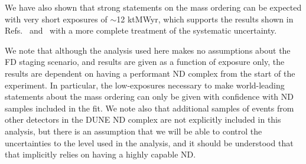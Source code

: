 We have also shown that strong statements on the mass ordering can be expected with very short exposures of $\sim$12 ktMWyr, which supports the results shown in Refs.~\cite{Abi:2020qib} and~\cite{Abi:2020evt} with a more complete treatment of the systematic uncertainty.

We note that although the analysis used here makes no assumptions about the FD staging scenario, and results are given as a function of exposure only, the results are dependent on having a performant ND complex from the start of the experiment. In particular, the low-exposures necessary to make world-leading statements about the mass ordering can only be given with confidence with ND samples included in the fit. We note also that additional samples of events from other detectors in the DUNE ND complex are not explicitly included in this analysis, but there is an assumption that we will be able to control the uncertainties to the level used in the analysis, and it should be understood that that implicitly relies on having a highly capable ND.
